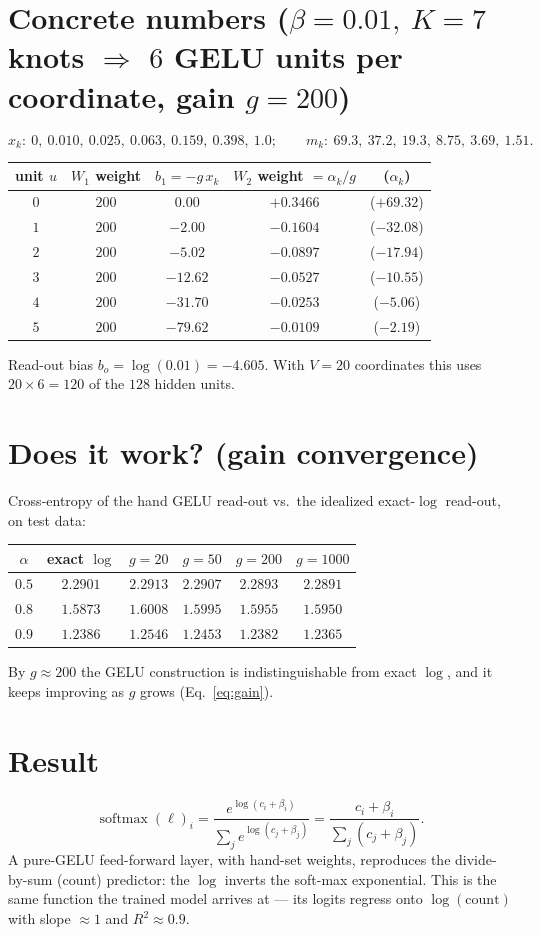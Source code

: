 \documentclass[11pt]{article}
\newcommand{\sm}{\operatorname{softmax}}
\begin{document}
\section{Concrete numbers ($\beta=0.01,\ K=7$ knots $\Rightarrow$ $6$ GELU units per coordinate, gain $g=200$)}
\[
x_k:\ 0,\ 0.010,\ 0.025,\ 0.063,\ 0.159,\ 0.398,\ 1.0;
\qquad
m_k:\ 69.3,\ 37.2,\ 19.3,\ 8.75,\ 3.69,\ 1.51 .
\]
\begin{center}
\begin{tabular}{ccccc}
\toprule
unit $u$ & $W_1$ weight & $b_1=-g\,x_k$ & $W_2$ weight $=\alpha_k/g$ & ($\alpha_k$) \\
\midrule
$0$ & $200$ & $0.00$    & $+0.3466$ & ($+69.32$)\\
$1$ & $200$ & $-2.00$   & $-0.1604$ & ($-32.08$)\\
$2$ & $200$ & $-5.02$   & $-0.0897$ & ($-17.94$)\\
$3$ & $200$ & $-12.62$  & $-0.0527$ & ($-10.55$)\\
$4$ & $200$ & $-31.70$  & $-0.0253$ & ($-5.06$)\\
$5$ & $200$ & $-79.62$  & $-0.0109$ & ($-2.19$)\\
\bottomrule
\end{tabular}
\end{center}
Read-out bias $b_o=\log(0.01)=-4.605$. With $V=20$ coordinates this uses
$20\times6=120$ of the $128$ hidden units.

\section{Does it work? (gain convergence)}
Cross-entropy of the hand GELU read-out vs.\ the idealized exact-$\log$ read-out, on test data:
\begin{center}
\begin{tabular}{cccccc}
\toprule
$\alpha$ & exact $\log$ & $g=20$ & $g=50$ & $g=200$ & $g=1000$\\
\midrule
$0.5$ & $2.2901$ & $2.2913$ & $2.2907$ & $2.2893$ & $2.2891$\\
$0.8$ & $1.5873$ & $1.6008$ & $1.5995$ & $1.5955$ & $1.5950$\\
$0.9$ & $1.2386$ & $1.2546$ & $1.2453$ & $1.2382$ & $1.2365$\\
\bottomrule
\end{tabular}
\end{center}
By $g\approx200$ the GELU construction is indistinguishable from exact $\log$, and it keeps
improving as $g$ grows (Eq.~\eqref{eq:gain}).

\section{Result}
\[
\sm(\boldsymbol\ell)_i=\frac{e^{\log(c_i+\beta_i)}}{\sum_j e^{\log(c_j+\beta_j)}}
=\frac{c_i+\beta_i}{\sum_j(c_j+\beta_j)} .
\]
A pure-GELU feed-forward layer, with hand-set weights, reproduces the divide-by-sum
(count) predictor: the $\log$ inverts the soft-max exponential. This is the same
function the trained model arrives at --- its logits regress onto $\log(\text{count})$
with slope $\approx1$ and $R^2\approx0.9$.
\end{document}
